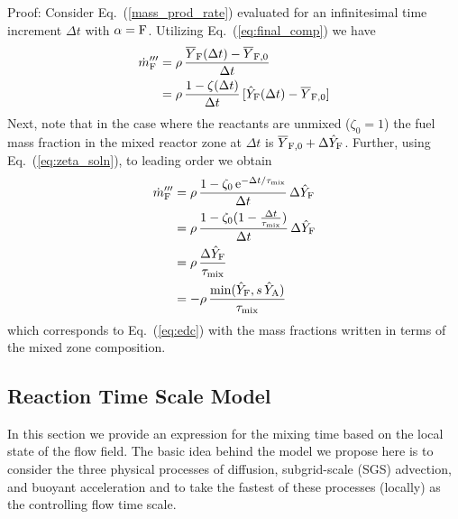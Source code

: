 {Proof:} Consider Eq.~(\ref{mass_prod_rate}) evaluated for an infinitesimal time increment $\Delta t$ with $\alpha={\rm F}$.  Utilizing Eq.~(\ref{eq:final_comp}) we have
\begin{align}
\label{eq:edcproof1}
\dot{m}^{\prime\prime\prime}_{\rm F} &= \rho \, \frac{\overline{Y}_{\rm F}(\Delta t) - \overline{Y}_{\rm F,0}}{\Delta t} \notag\\
&=\rho \, \frac{1-\zeta(\Delta t)}{\Delta t} \, [\hat{Y}_{\rm F}(\Delta t) - \overline{Y}_{\rm F,0}] 
\end{align}
Next, note that in the case where the reactants are unmixed ($\zeta_0=1$) the fuel mass fraction in the mixed reactor zone at $\Delta t$ is $\overline{Y}_{\rm F,0} + \Delta \hat{Y}_{\rm F}$.  Further, using Eq.~(\ref{eq:zeta_soln}), to leading order we obtain
\begin{align}
\dot{m}^{\prime\prime\prime}_{\rm F}
&= \rho \, \frac{1-\zeta_0 \, {\rm e}^{-\Delta t/\tau_{\rm mix}}}{\Delta t} \, \Delta \hat{Y}_{\rm F} \notag \\
&= \rho \, \frac{1-\zeta_0 (1 - \frac{\Delta t}{\tau_{\rm mix}})}{\Delta t} \, \Delta \hat{Y}_{\rm F} \notag \\
&= \rho \, \frac{\Delta \hat{Y}_{\rm F}}{\tau_{\rm mix}} \notag \\
&= - \rho \, \frac{ \min(\hat{Y}_{\rm F}, s \, \hat{Y}_{\rm A}) }{ \tau_{\rm mix} }
\end{align}
which corresponds to Eq.~(\ref{eq:edc}) with the mass fractions written in terms of the mixed zone composition.


\subsection{Reaction Time Scale Model}
\label{sec:reac_time_scale}

In this section we provide an expression for the mixing time based on the local state of the flow field.  The basic idea behind the model we propose here is to consider the three physical processes of diffusion, subgrid-scale (SGS) advection, and buoyant acceleration and to take the fastest of these processes (locally) as the controlling flow time scale.

